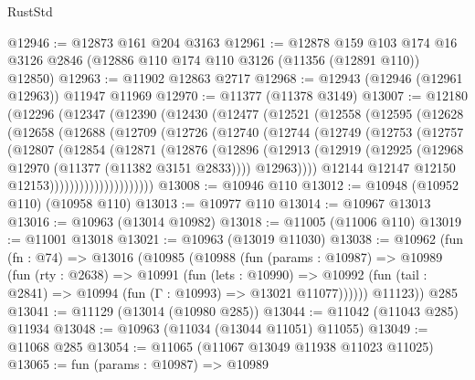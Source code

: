 \begin{lexlean}{RustStd}
\begin{coremodule}
{\begin{coremodule}
{{{{{{{{{{{{{{{{{{{{{{{{{{{{{{{{{@12946 := @12873 @161 @204 @3163
@12961 := @12878
    @159
    @103
    @174
    @16
    @3126
    @2846
    (@12886 @110 @174 @110 @3126 (@11356 (@12891 @110)) @12850)
@12963 := @11902 @12863 @2717
@12968 := @12943 (@12946 (@12961 @12963)) @11947 @11969
@12970 := @11377 (@11378 @3149)
@13007 := @12180
    (@12296
      (@12347
        (@12390
          (@12430
            (@12477
              (@12521
                (@12558
                  (@12595
                    (@12628
                      (@12658
                        (@12688
                          (@12709
                            (@12726
                              (@12740
                                (@12744
                                  (@12749
                                    (@12753
                                      (@12757
                                        (@12807
                                          (@12854
                                            (@12871
                                              (@12876
                                                (@12896
                                                  (@12913
                                                    (@12919
                                                      (@12925
                                                        (@12968
                                                          @12970
                                                          (@11377 (@11382 @3151 @2833))))
                                                      @12963))))
                                              @12144
                                              @12147
                                              @12150
                                              @12153)))))))))))))))))))))
@13008 := @10946 @110
@13012 := @10948 (@10952 @110) (@10958 @110)
@13013 := @10977 @110
@13014 := @10967 @13013
@13016 := @10963 (@13014 @10982)
@13018 := @11005 (@11006 @110)
@13019 := @11001 @13018
@13021 := @10963 (@13019 @11030)
@13038 := @10962
    (fun (fn : @74) =>
    @13016
      (@10985
        (@10988
          (fun (params : @10987) =>
          @10989
            (fun (rty : @2638) =>
            @10991
              (fun (lets : @10990) =>
              @10992 (fun (tail : @2841) => @10994 (fun (Γ : @10993) => @13021 @11077))))))
        @11123))
    @285
@13041 := @11129 (@13014 (@10980 @285))
@13044 := @11042 (@11043 @285) @11934
@13048 := @10963 (@11034 (@13044 @11051) @11055)
@13049 := @11068 @285
@13054 := @11065 (@11067 @13049 @11938 @11023 @11025)
@13065 := fun (params : @10987) =>
  @10989
}}}}}}}}}}}}}}}}}}}}}}}}}}}}}}}}}
\end{coremodule}}
\end{coremodule}
\end{lexlean}
